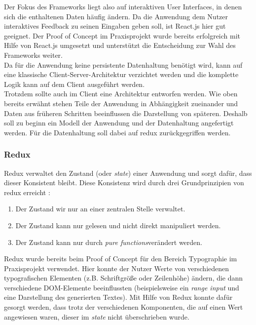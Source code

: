 Der Fokus des Frameworks liegt also auf interaktiven User Interfaces, in denen sich die enthaltenen Daten häufig ändern. Da die Anwendung dem Nutzer interaktives Feedback zu seinen Eingaben geben soll, ist React.js hier gut geeignet. Der Proof of Concept im Praxisprojekt wurde bereits erfolgreich mit Hilfe von React.js umgesetzt und unterstützt die Entscheidung zur Wahl des Frameworks weiter. \\

Da für die Anwendung keine persistente Datenhaltung benötigt wird, kann auf eine klassische Client-Server-Architektur verzichtet werden und die komplette Logik kann auf dem Client ausgeführt werden.\\
Trotzdem sollte auch im Client eine Architektur entworfen werden. Wie oben bereits erwähnt stehen Teile der Anwendung in Abhängigkeit zueinander und Daten aus früheren Schritten beeinflussen die Darstellung von späteren\footnotemark[1]. Deshalb soll zu beginn ein Modell der Anwendung und der Datenhaltung angefertigt werden. Für die Datenhaltung soll dabei auf redux zurückgegriffen werden.

\subsubsection{Redux}
Redux verwaltet den Zustand (oder \textit{state}) einer Anwendung und sorgt dafür, dass dieser Konsistent bleibt. Diese Konsistenz wird durch drei Grundprinzipien von redux erreicht \cite{threeprinciplesredux}:

\begin{enumerate}
  \item Der Zustand wir nur an einer zentralen Stelle verwaltet.
  \item Der Zustand kann nur gelesen und nicht direkt manipuliert werden.
  \item Der Zustand kann nur durch \textit{pure functions}\footnotemark[2] verändert werden.
\end{enumerate}

Redux wurde bereits beim Proof of Concept für den Bereich Typographie im Praxisprojekt verwendet. Hier konnte der Nutzer Werte von verschiedenen typografischen Elementen (z.B. Schriftgröße oder Zeilenhöhe) ändern, die dann verschiedene DOM-Elemente beeinflussten (beispielsweise ein \textit{range input} und eine Darstellung des generierten Textes). Mit Hilfe von Redux konnte dafür gesorgt werden, dass trotz der verschiedenen Komponenten, die auf einen Wert angewiesen waren, dieser im \textit{state} nicht überschrieben wurde.

